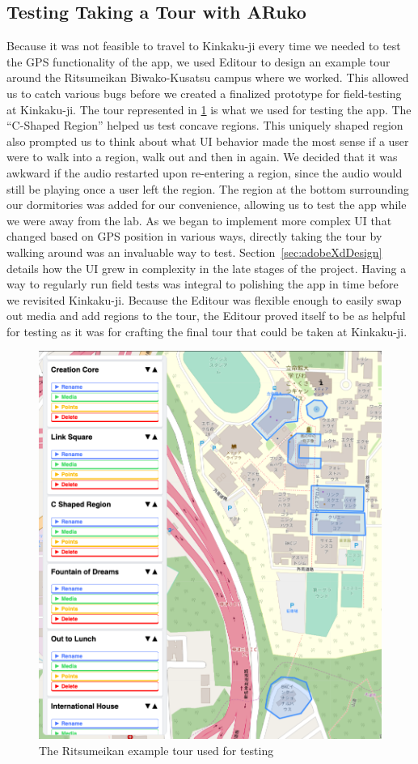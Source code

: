 \documentclass[a4paper, 10pt, american, titlepage]{article}
\begin{document}
\subsection{Testing Taking a Tour with ARuko}
\label{sec:testingARuko}

Because it was not feasible to travel to Kinkaku-ji every time we needed to
test the GPS functionality of the app, we used Editour to design an example
tour around the Ritsumeikan Biwako-Kusatsu campus where we worked. This allowed
us to catch various bugs before we created a finalized prototype for
field-testing at Kinkaku-ji. The tour represented in \ref{fig:ritsuTour} is
what we used for testing the app. The ``C-Shaped Region'' helped us test
concave regions. This uniquely shaped region also prompted us to think about
what UI behavior made the most sense if a user were to walk into a region, walk
out and then in again. We decided that it was awkward if the audio restarted
upon re-entering a region, since the audio would still be playing once a user
left the region. The region at the bottom surrounding our dormitories was added
for our convenience, allowing us to test the app while we were away from the
lab.  As we began to implement more complex UI that changed based on GPS
position in various ways, directly taking the tour by walking around was an
invaluable way to test. Section~\ref{sec:adobeXdDesign} details how the UI grew
in complexity in the late stages of the project. Having a way to regularly run
field tests was integral to polishing the app in time before we revisited
Kinkaku-ji.  Because the Editour was flexible enough to easily swap out media
and add regions to the tour, the Editour proved itself to be as helpful for
testing as it was for crafting the final tour that could be taken at
Kinkaku-ji.

\begin{figure}[h]
	\centering
	\includegraphics[width=.5\textwidth]{ritsu-tour.png}
	\caption{The Ritsumeikan example tour used for testing}
	\label{fig:ritsuTour}
\end{figure}
\end{document}
